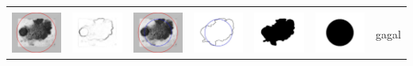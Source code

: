 \begin{table}[H]
\begin{tabular}{|m{0.7in}|m{0.7in}|m{0.7in}|m{0.7in}|m{0.7in}|m{0.7in}|m{0.7in}|}
		&  &  & & & &  \\
		\includegraphics[width=0.7in]{dataset/dataset_3/luka_hitam/ready/27_integer_init.jpg}&
		\includegraphics[width=0.7in]{dataset/dataset_3/luka_hitam/ready/27_integer_ext.jpg}&
		\includegraphics[width=0.7in]{dataset/dataset_3/luka_hitam/ready/27_integer_result.jpg}&
		\includegraphics[width=0.7in]{dataset/dataset_3/luka_hitam/ready/27_gt_r_integer.jpg}&
		\includegraphics[width=0.7in]{dataset/dataset_3/luka_hitam/ready/27_r.jpg}&
		\includegraphics[width=0.7in]{dataset/dataset_3/luka_hitam/ready/27_integer_r.jpg}&
		gagal\\
		\hline
		

\end{tabular}
\end{table}
